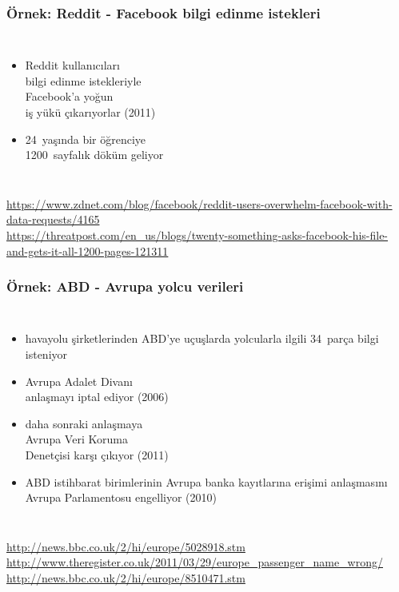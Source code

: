 \documentclass[dvipsnames]{beamer}
\theoremstyle{definition}
\theoremstyle{example}
\theoremstyle{plain}
\begin{document}
\begin{frame}
  \frametitle{Örnek: Reddit - Facebook bilgi edinme istekleri}

  \begin{columns}

    \begin{itemize}
      \item Reddit kullanıcıları\\
        bilgi edinme istekleriyle\\
        Facebook'a yoğun\\
        iş yükü çıkarıyorlar (2011)
      \item 24~yaşında bir öğrenciye\\
        1200~sayfalık döküm geliyor
    \end{itemize}
  \end{columns}

  \medskip
  \tiny{\url{https://www.zdnet.com/blog/facebook/reddit-users-overwhelm-facebook-with-data-requests/4165}}\\
  \tiny{\url{https://threatpost.com/en_us/blogs/twenty-something-asks-facebook-his-file-and-gets-it-all-1200-pages-121311}}\\
\end{frame}

\begin{frame}
  \frametitle{Örnek: ABD - Avrupa yolcu verileri}

  \begin{columns}

    \begin{itemize}
      \item havayolu şirketlerinden ABD'ye uçuşlarda yolcularla ilgili 34~parça
        bilgi isteniyor
      \item Avrupa Adalet Divanı\\
        anlaşmayı iptal ediyor (2006)
      \item daha sonraki anlaşmaya\\
        Avrupa Veri Koruma\\
        Denetçisi karşı çıkıyor (2011)

      \pause
      \item ABD istihbarat birimlerinin Avrupa banka kayıtlarına erişimi
        anlaşmasını Avrupa Parlamentosu engelliyor (2010)
    \end{itemize}
  \end{columns}

  \medskip
  \tiny{\url{http://news.bbc.co.uk/2/hi/europe/5028918.stm}}\\
  \tiny{\url{http://www.theregister.co.uk/2011/03/29/europe_passenger_name_wrong/}}\\
  \tiny{\url{http://news.bbc.co.uk/2/hi/europe/8510471.stm}}\\
\end{frame}
\end{document}
